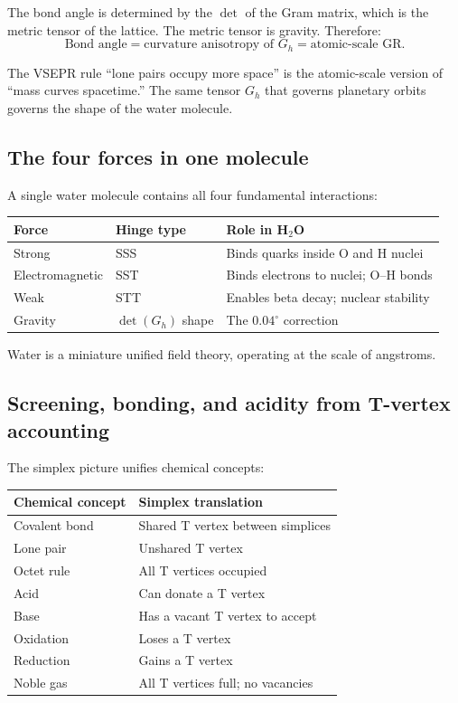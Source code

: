\documentclass[12pt]{article}
\theoremstyle{remark}
\begin{document}
The bond angle is determined by the $\det$ of the Gram matrix, which is the metric tensor of the lattice. The metric tensor is gravity. Therefore:
\begin{equation}
\text{Bond angle} = \text{curvature anisotropy of } G_h = \text{atomic-scale GR}.
\end{equation}

The VSEPR rule ``lone pairs occupy more space'' is the atomic-scale version of ``mass curves spacetime.'' The same tensor $G_h$ that governs planetary orbits governs the shape of the water molecule.

\subsection{The four forces in one molecule}

A single water molecule contains all four fundamental interactions:
\begin{center}
\begin{tabular}{lll}
\hline
Force & Hinge type & Role in H$_2$O \\
\hline
Strong & SSS & Binds quarks inside O and H nuclei \\
Electromagnetic & SST & Binds electrons to nuclei; O--H bonds \\
Weak & STT & Enables beta decay; nuclear stability \\
Gravity & $\det(G_h)$ shape & The $0.04^\circ$ correction \\
\hline
\end{tabular}
\end{center}

Water is a miniature unified field theory, operating at the scale of angstroms.

\subsection{Screening, bonding, and acidity from T-vertex accounting}

The simplex picture unifies chemical concepts:
\begin{center}
\begin{tabular}{ll}
\hline
Chemical concept & Simplex translation \\
\hline
Covalent bond & Shared T vertex between simplices \\
Lone pair & Unshared T vertex \\
Octet rule & All T vertices occupied \\
Acid & Can donate a T vertex \\
Base & Has a vacant T vertex to accept \\
Oxidation & Loses a T vertex \\
Reduction & Gains a T vertex \\
Noble gas & All T vertices full; no vacancies \\
\hline
\end{tabular}
\end{center}
\end{document}
